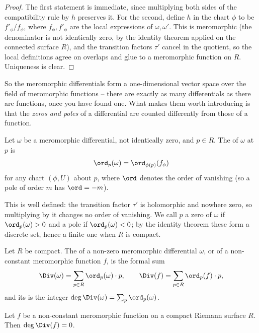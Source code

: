 \begin{proof}
	The first statement is immediate, since multiplying both sides of the compatibility
	rule by $h$ preserves it. For the second, define $h$ in the chart $\phi$ to be
	$f'_\phi/f_\phi$, where $f_\phi, f'_\phi$ are the local expressions of $\omega,
	\omega'$. This is meromorphic (the denominator is not identically zero, by the identity
	theorem applied on the connected surface $R$), and the transition factors $\tau'$
	cancel in the quotient, so the local definitions agree on overlaps and glue to a
	meromorphic function on $R$. Uniqueness is clear.
\end{proof}

So the meromorphic differentials form a one-dimensional vector space over the field of
meromorphic functions -- there are exactly as many differentials as there are functions,
once you have found one. What makes them worth introducing is that the \emph{zeros and
poles} of a differential are counted differently from those of a function.

\begin{definition}[Order]
	Let $\omega$ be a meromorphic differential, not identically zero, and $p \in R$. The
	 of $\omega$ at $p$ is
	$$
	\ord_p(\omega) = \ord_{\phi(p)}(f_\phi)
	$$
	for any chart $(\phi, U)$ about $p$, where $\ord$ denotes the order of vanishing (so a
	pole of order $m$ has $\ord = -m$).
\end{definition}

This is well defined: the transition factor $\tau'$ is holomorphic and nowhere zero, so
multiplying by it changes no order of vanishing. We call $p$ a zero of $\omega$ if
$\ord_p(\omega) > 0$ and a pole if $\ord_p(\omega) < 0$; by the identity theorem these
form a discrete set, hence a finite one when $R$ is compact.

\begin{definition}
	Let $R$ be compact. The  of a non-zero meromorphic differential
	$\omega$, or of a non-constant meromorphic function $f$, is the formal sum
	$$
	\Div(\omega) = \sum_{p \in R} \ord_p(\omega)\cdot p, \qquad
	\Div(f) = \sum_{p\in R}\ord_p(f)\cdot p,
	$$
	and its  is the integer $\deg\Div(\omega) = \sum_p \ord_p(\omega)$.
\end{definition}

\begin{lemma}\label{lem:degdivf}
	Let $f$ be a non-constant meromorphic function on a compact Riemann surface $R$. Then
	$\deg\Div(f) = 0$.
\end{lemma}

